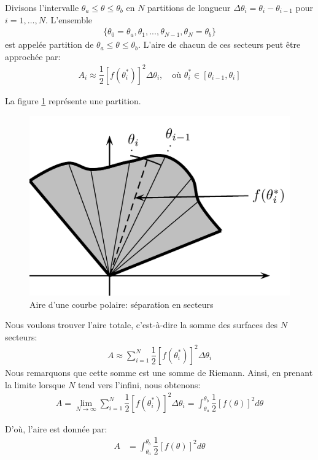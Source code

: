 \documentclass[]{book}
\theoremstyle{definition}
\theoremstyle{definition}
\theoremstyle{definition}
\theoremstyle{remark}
\begin{document}
Divisons l'intervalle \(\theta_a\leq \theta \leq \theta_b\) en \(N\)
partitions de longueur \(\Delta \theta_i=\theta_i-\theta_{i-1}\) pour
\(i=1,\ldots,N\). L'ensemble \begin{align*}
\{\theta_0=\theta_a,\theta_1,...,\theta_{N-1},\theta_{N}=\theta_b\}
\end{align*} est appelée partition de
\(\theta_a\leq \theta \leq \theta_b\). L'aire de chacun de ces secteurs
peut être approchée par: \begin{align*}
A_i\approx \dfrac{1}{2}[f(\theta_i^*)]^2\Delta \theta_i, \quad \text{où $\theta_i^*\in [\theta_{i-1},\theta_{i}]$}
\end{align*}

La figure \ref{fig:airepolaire2} représente une partition.

\begin{figure}

{\centering \includegraphics[width=0.5\linewidth]{resources/images/latex/airepolaire2} 

}

\caption{Aire d'une courbe polaire: séparation en secteurs}\label{fig:airepolaire2}
\end{figure}

Nous voulons trouver l'aire totale, c'est-à-dire la somme des surfaces
des \(N\) secteurs: \begin{align*}
A\approx \sum_{i=1}^N\dfrac{1}{2}[f(\theta_i^*)]^2\Delta \theta_i
\end{align*} Nous remarquons que cette somme est une somme de Riemann.
Ainsi, en prenant la limite lorsque \(N\) tend vers l'infini, nous
obtenons: \begin{align*}
A=\lim_{N\rightarrow \infty } \sum_{i=1}^N\dfrac{1}{2}[f(\theta_i^*)]^2\Delta \theta_i=\int_{\theta_a}^{\theta_b}\dfrac{1}{2}[f(\theta)]^2d \theta
\end{align*}

D'où, l'aire est donnée par: \begin{align*}
A &= \int_{\theta_a}^{\theta_b}\dfrac{1}{2}[f(\theta)]^2 d\theta
\end{align*}
\end{document}
